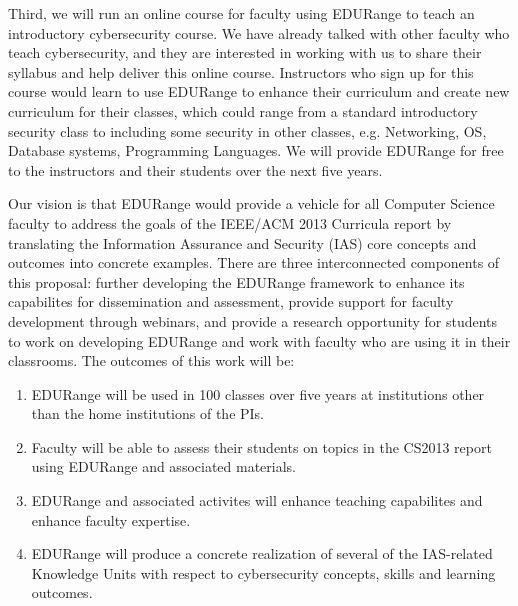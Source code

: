 Third, we will run an online course for faculty using EDURange to teach an introductory cybersecurity
course.  We have already talked with other faculty who teach cybersecurity, and they are interested in 
working with us to share their syllabus and help deliver this online course.  
Instructors who sign up for this course would learn
to use EDURange to enhance their curriculum and create new curriculum for their classes, which could range from 
a standard introductory
security class to including some 
security in other classes, e.g. Networking, OS, Database systems, Programming Languages.
We will provide EDURange for free to the instructors and their students over the next five years.


Our vision is that EDURange would provide a vehicle for all Computer Science faculty to address the goals of 
the IEEE/ACM 2013
Curricula report by translating the Information Assurance and Security (IAS) core concepts and outcomes into
concrete examples.  There are three interconnected components of this proposal: further developing the
EDURange framework to enhance its capabilites for dissemination and assessment, provide support for faculty development
through webinars, and provide a research opportunity for students to work on developing EDURange and work
with faculty who are using it in their classrooms.
The outcomes of this work will be:

\begin{enumerate}
\item EDURange will be used in 100 classes over five years at institutions other than the home institutions of
  the PIs.
\item Faculty will be able to assess their students on topics in the CS2013 report using EDURange and 
  associated materials.
\item EDURange and associated activites will enhance teaching capabilites and enhance faculty expertise.
\item EDURange will produce a concrete realization of several of the IAS-related Knowledge Units
  with respect to cybersecurity concepts, skills and learning outcomes.
\end{enumerate}



